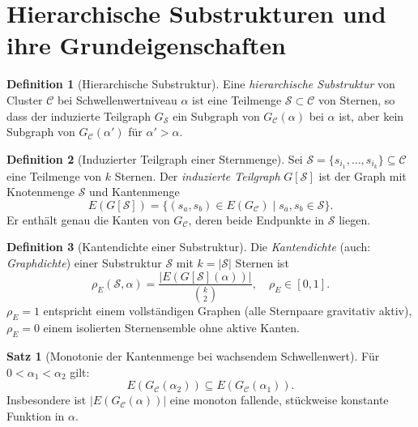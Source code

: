 ﻿\documentclass[a4paper,12pt]{report}
\theoremstyle{definition}
\newtheorem{definition}{Definition}
\newtheorem{satz}{Satz}
\begin{document}
\section{Hierarchische Substrukturen und ihre Grundeigenschaften}
\label{sec:hier_grundlagen}

\begin{definition}[Hierarchische Substruktur]
\label{def:hier_substru}
Eine \emph{hierarchische Substruktur} von Cluster $\mathcal{C}$ bei Schwellenwertniveau $\alpha$ ist eine Teilmenge $\mathcal{S} \subset \mathcal{C}$ von Sternen, so dass der induzierte Teilgraph $G_\mathcal{S}$ ein Subgraph von $G_\mathcal{C}(\alpha)$ bei $\alpha$ ist, aber kein Subgraph von $G_\mathcal{C}(\alpha')$ für $\alpha' > \alpha$.
\end{definition}

\begin{definition}[Induzierter Teilgraph einer Sternmenge]
\label{def:induziertergraph}
Sei $\mathcal{S} = \{s_{i_1}, \ldots, s_{i_k}\} \subseteq \mathcal{C}$ eine Teilmenge von $k$ Sternen. Der \emph{induzierte Teilgraph} $G[\mathcal{S}]$ ist der Graph mit Knotenmenge $\mathcal{S}$ und Kantenmenge
\[
E(G[\mathcal{S}]) = \{(s_a, s_b) \in E(G_\mathcal{C}) \mid s_a, s_b \in \mathcal{S}\}.
\]
Er enthält genau die Kanten von $G_\mathcal{C}$, deren beide Endpunkte in $\mathcal{S}$ liegen.
\end{definition}

\begin{definition}[Kantendichte einer Substruktur]
\label{def:kantendichte}
Die \emph{Kantendichte} (auch: \emph{Graphdichte}) einer Substruktur $\mathcal{S}$ mit $k = |\mathcal{S}|$ Sternen ist
\[
\rho_E(\mathcal{S}, \alpha) = \frac{|E(G[\mathcal{S}](\alpha))|}{\binom{k}{2}}, \quad \rho_E \in [0, 1].
\]
$\rho_E = 1$ entspricht einem vollständigen Graphen (alle Sternpaare gravitativ aktiv), $\rho_E = 0$ einem isolierten Sternensemble ohne aktive Kanten.
\end{definition}

\begin{satz}[Monotonie der Kantenmenge bei wachsendem Schwellenwert]
\label{satz:monotonie_kanten}
Für $0 < \alpha_1 < \alpha_2$ gilt:
\[
E(G_\mathcal{C}(\alpha_2)) \subseteq E(G_\mathcal{C}(\alpha_1)).
\]
Insbesondere ist $|E(G_\mathcal{C}(\alpha))|$ eine monoton fallende, stückweise konstante Funktion in $\alpha$.
\end{satz}
\end{document}
